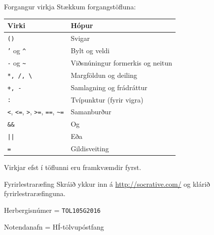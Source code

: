 \documentclass{beamer}
\begin{document}
\begin{frame}{Forgangur virkja}
\vspace{-0.5cm}
Stækkum forgangstöfluna:
\begin{center}
\small
\begin{tabular}{ll}
\toprule
Virki&Hópur\\
\midrule
\texttt{()}&Svigar\\
\texttt{'} og \texttt{\^}&Bylt og veldi\\
\texttt{-} og \texttt{\~{}}&Viðsnúningur formerkis og neitun\\
\texttt{*, /, \textbackslash}&Margföldun og deiling\\
\texttt{+, -}&Samlagning og frádráttur\\
\texttt{:}&Tvípunktur (fyrir vigra)\\
\texttt{<}, \texttt{<=}, \texttt{>}, \texttt{>=}, \texttt{==}, \texttt{\~{}=}&Samanburður\\
\texttt{\&\&}&Og\\
\texttt{||}&Eða\\
\texttt{=}&Gildisveiting\\
\bottomrule
\end{tabular}
\end{center}
Virkjar efst í töflunni eru framkvæmdir fyrst.
\end{frame}

\begin{frame}{Fyrirlestraræfing}
Skráið ykkur inn á \url{http://socrative.com/} og klárið fyrirlestraræfinguna.

Herbergisnúmer = \texttt{TOL105G2016}

Notendanafn = HÍ-tölvupóstfang
\end{frame}
\end{document}
